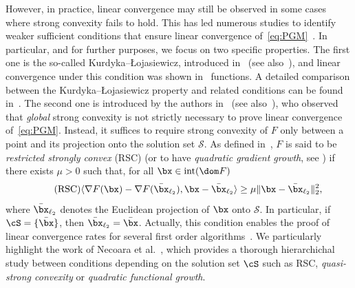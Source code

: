 \documentclass[11pt]{amsart}
\newcommand{\jc}[1]{{\color{red}#1}}
\begin{document}
However, in practice, linear convergence may still be observed in some cases where strong convexity fails to hold. This has led numerous studies to identify weaker sufficient conditions that ensure linear convergence of~\eqref{eq:PGM}~\cite{Attouch2013,beck2017,Drus2018,Luo1993,Neco2016,necoara2019linear,zhang2015,Zhou2017}. In particular, and for further purposes, we focus on two specific properties. The first one is the so-called Kurdyka--{\L}ojasiewicz, introduced in~\cite{Kurdyka1998,loj1963} (see also~\cite{Bolte2007}), and
linear convergence under this condition was shown in~\cite{Attouch2013,Peypo2017,Li2017} functions.
 A detailed comparison between the Kurdyka--{\L}ojasiewicz property and related conditions can be found in~\cite{karimi2016}. The second one is introduced by the authors in~\cite{Lai2013} (see also~\cite{liu2014,Gha2014,zhang2015}), who observed that \emph{global} strong convexity is not strictly necessary to prove linear convergence of~\eqref{eq:PGM}. Instead, it suffices to require strong convexity of $F$ only between a point and its projection onto the solution set $\mathcal{S}$. As defined in~\cite[Lemma 7]{Lai2013}, $F$ is said to be \emph{restricted strongly convex} (RSC) (or to have \emph{quadratic gradient growth}, see \cite[Definition 3]{necoara2019linear}) if there exists $\mu >0$ such that, for all $\bx\in\mathrm{int}(\dom F)$ 
\begin{equation}\label{eq:RSC}
\tag{RSC}
\langle \nabla F(\bx)-\nabla F(\bar\bx_{\ell_2}), \bx-\bar\bx_{\ell_2}\rangle\geq\mu\|\bx-\bar\bx_{\ell_2}\|_2^2,
\end{equation}
where $\bar\bx_{\ell_2}$ denotes the Euclidean projection of $\bx$ onto $\mathcal{S}$. In particular, if $\cS=\{\bar\bx\}$, then $\bar\bx_{\ell_2}=\bar\bx$. Actually, this condition enables the proof of linear convergence rates for several first order algorithms~\cite{Lai2013,necoara2019linear,Gha2014,zhang2015}. We particularly highlight the work of Necoara et al.~\cite{necoara2019linear}, which provides a thorough hierarchichal study between conditions depending on the solution set $\cS$ such as RSC, \emph{quasi-strong convexity} or \emph{quadratic functional growth}.\\
\end{document}
